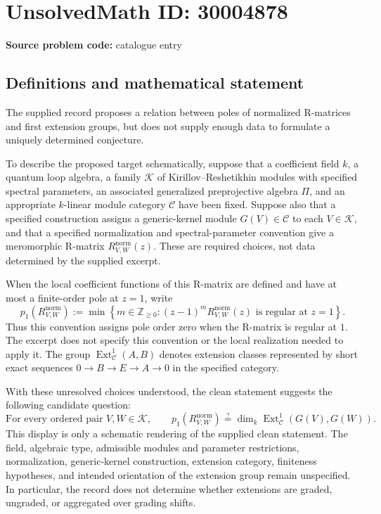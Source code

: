 \documentclass[11pt]{article}
\begin{document}
\section*{UnsolvedMath ID: 30004878}
\textbf{Source problem code:} catalogue entry
\subsection{Definitions and mathematical statement}
The supplied record proposes a relation between poles of normalized R-matrices and first extension groups, but does not supply enough data to formulate a uniquely determined conjecture.

To describe the proposed target schematically, suppose that a coefficient field \(k\), a quantum loop algebra, a family \(\mathcal K\) of Kirillov--Reshetikhin modules with specified spectral parameters, an associated generalized preprojective algebra \(\Pi\), and an appropriate \(k\)-linear module category \(\mathcal C\) have been fixed. Suppose also that a specified construction assigns a generic-kernel module \(G(V)\in\mathcal C\) to each \(V\in\mathcal K\), and that a specified normalization and spectral-parameter convention give a meromorphic R-matrix \(R^{\mathrm{norm}}_{V,W}(z)\). These are required choices, not data determined by the supplied excerpt.

When the local coefficient functions of this R-matrix are defined and have at most a finite-order pole at \(z=1\), write
\[
 p_1\!\left(R^{\mathrm{norm}}_{V,W}\right)
 :=\min\left\{m\in\mathbb Z_{\geq0}:
 (z-1)^mR^{\mathrm{norm}}_{V,W}(z)
 \text{ is regular at }z=1\right\}.
\]
Thus this convention assigns pole order zero when the R-matrix is regular at \(1\). The excerpt does not specify this convention or the local realization needed to apply it. The group \(\operatorname{Ext}^1_{\mathcal C}(A,B)\) denotes extension classes represented by short exact sequences \(0\to B\to E\to A\to0\) in the specified category.

With these unresolved choices understood, the clean statement suggests the following candidate question:
\[
 \text{For every ordered pair }V,W\in\mathcal K,\qquad
 p_1\!\left(R^{\mathrm{norm}}_{V,W}\right)
 \stackrel{?}{=}
 \dim_k\operatorname{Ext}^1_{\mathcal C}\!\left(G(V),G(W)\right).
\]
This display is only a schematic rendering of the supplied clean statement. The field, algebraic type, admissible modules and parameter restrictions, normalization, generic-kernel construction, extension category, finiteness hypotheses, and intended orientation of the extension group remain unspecified. In particular, the record does not determine whether extensions are graded, ungraded, or aggregated over grading shifts.
\end{document}
